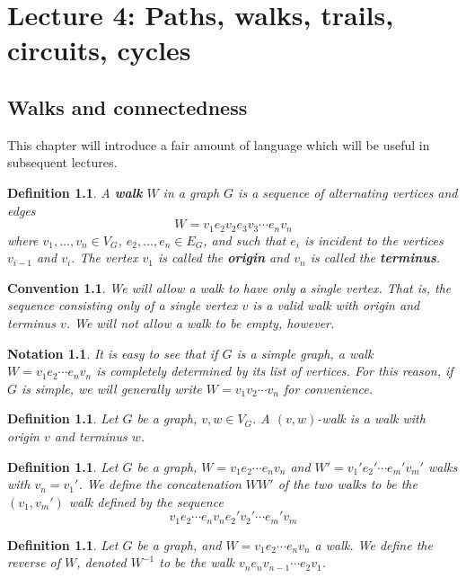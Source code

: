 \documentclass[12pt]{report}
\theoremstyle{plain}
\newtheorem{defn}[thm]{Definition}
\newtheorem{notn}[thm]{Notation}
\newtheorem{convention}[thm]{Convention}
\newcommand{\Xb}[1]{\textbf{#1}\index{#1}}
\begin{document}
\chapter{Lecture 4: Paths, walks, trails, circuits, cycles}

\section{Walks and connectedness}

This chapter will introduce a fair amount of language which will be useful
in subsequent lectures. 

\begin{defn}
A \Xb{walk} $W$ in a graph $G$ is a sequence of alternating vertices and
edges
\[ W = v_1 e_2 v_2 e_3 v_3 \cdots e_n v_n \]
where $v_1, \ldots, v_n \in V_G$, $e_2, \ldots, e_n \in E_G$, and such that
$e_i$ is incident to the vertices $v_{i-1}$ and $v_i$. The vertex $v_1$ is
called the \textbf{origin} and $v_n$ is called
the \textbf{terminus}.
\end{defn}

\begin{convention}
We will allow a walk to have only a single vertex. That is, the sequence
consisting only of a single vertex $v$ is a valid walk with origin and
terminus $v$. We will not allow a walk to be empty, however.
\end{convention}

\begin{notn}
It is easy to see that if $G$ is a simple graph, a walk $W = v_1 e_2 \cdots
e_n v_n$ is completely determined by its list of vertices. For this reason,
if $G$ is simple, we will generally write $W = v_1 v_2 \cdots v_n$ for
convenience.
\end{notn}

\begin{defn}
Let $G$ be a graph, $v, w \in V_G$. A $(v, w)$-walk is a walk with origin
$v$ and terminus $w$.
\end{defn}

\begin{defn}
Let $G$ be a graph, $W = v_1 e_2 \cdots e_n v_n$ and $W' = v_1' e_2' \cdots
e_m' v_m'$ walks with $v_n = v_1'$. We define the concatenation $WW'$ of
the two walks to be the $(v_1,v_m')$ walk defined by the sequence
\[v_1 e_2 \cdots e_n v_n e_2' v_2' \cdots e_m' v_m \]
\end{defn}

\begin{defn}
Let $G$ be a graph, and $W = v_1 e_2 \cdots e_n v_n$ a walk. We define the
reverse of $W$, denoted $W^{-1}$ to be the walk $v_n e_n v_{n-1} \cdots e_2
v_1$.
\end{defn}
\end{document}

